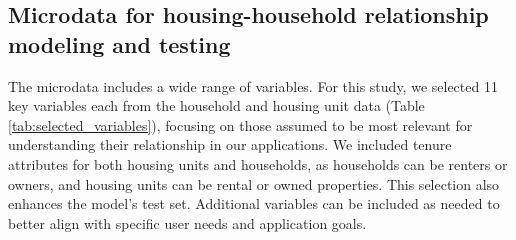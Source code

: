 \documentclass[]{nature_mod}
\begin{document}
\subsection{Microdata for housing-household relationship modeling and testing}

The microdata includes a wide range of variables. For this study, we selected 11 key variables each from the household and housing unit data (Table \ref{tab:selected_variables}), focusing on those assumed to be most relevant for understanding their relationship in our applications. We included tenure attributes for both housing units and households, as households can be renters or owners, and housing units can be rental or owned properties. This selection also enhances the model’s test set. Additional variables can be included as needed to better align with specific user needs and application goals.
\end{document}
